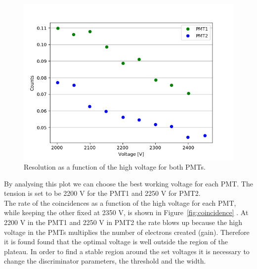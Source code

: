 \documentclass[10pt,swedish, openany]{book}
\begin{document}
\begin{figure}[H]
\includegraphics[scale=0.6]{Resolution.png}
\centering
\caption{Resolution as a function of the high voltage for both PMTs.}
\label{fig:res}
\end{figure}

By analysing this plot we can choose the best working voltage for each PMT. The tension is set to be 2200 V for the PMT1 and 2250 V for PMT2.\\

The rate of the coincidences as a function of the high voltage for each PMT, while keeping the other fixed at 2350 V, is shown in Figure~\ref{fig:coincidence} . At 2200 V in the PMT1 and 2250 V in PMT2 the rate blows up because the high voltage in the PMTs multiplies the number of electrons created (gain). Therefore it is found found that the optimal voltage is well outside the region of the plateau. In order to find a stable region around the set voltages it is necessary to change the discriminator parameters, the threshold and the width.
\end{document}
